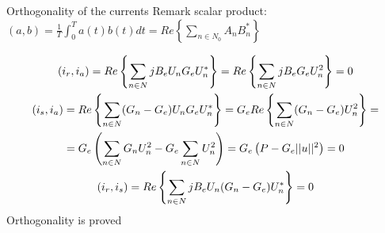 \documentclass[aspectratio=169]{beamer}
\begin{document}
  \begin{frame}{Orthogonality of the currents}{\insertsection}
    Remark scalar product: $(a,b) = \frac{1}{T}\int_{0}^{T}a(t)b(t)dt=Re\left\{\sum_{n\in N_0}A_nB_n^*\right\}$
  
    \begin{gather}
      (i_r, i_a) = Re\left\{\sum_{n \in N}jB_eU_nG_eU_n^*\right\} =  Re\left\{\sum_{n \in N}jB_eG_eU_n^2\right\} = 0\\
      (i_s, i_a) = Re\left\{\sum_{n \in N}(G_n-G_e)U_nG_eU_n^*\right\} = G_e Re\left\{\sum_{n \in N}(G_n-G_e)U_n^2\right\} = \notag\\
      = G_e\left( \sum_{n\in N}G_nU_n^2-G_e\sum_{n\in N}U_n^2\right) = G_e\left(P-G_e||u||^2\right)=0\\
      (i_r, i_s) = Re\left\{\sum_{n\in N}jB_eU_n(G_n-G_e)U_n^*\right\}=0
    \end{gather}
    Orthogonality is proved
  \end{frame}
      
\end{document}
